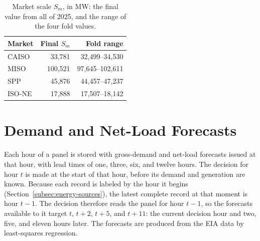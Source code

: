 \documentclass{UNCC-thesis}
\begin{document}
\begin{table}[htbp]
  \centering
  \footnotesize
  \caption{Market scale \(S_m\), in MW: the final value from
  all of 2025, and the range of the four fold values.}
  \label{tab:frozen-stats}
  \begin{tabular}{@{}lrr@{}}
    \toprule
    Market & Final \(S_m\) & Fold range \\
    \midrule
    CAISO          & 33,781  & 32,499--34,530 \\
    MISO           & 100,521 & 97,645--102,611 \\
    SPP            & 45,876  & 44,457--47,237 \\
    ISO-NE         & 17,888  & 17,507--18,142 \\
    \bottomrule
  \end{tabular}
\end{table}

\section{Demand and Net-Load Forecasts}
\label{subsec:energy-forecasts}

Each hour of a panel is stored with gross-demand and net-load forecasts
issued at that hour, with lead times of one, three, six, and twelve hours.
The decision for hour \(t\) is made at the start of that hour, before its
demand and generation are known. Because each record is labeled by the hour
it begins (Section~\ref{subsec:energy-sources}), the latest complete record
at that moment is hour \(t-1\). The decision therefore reads the panel for
hour \(t-1\), so the forecasts available to it target \(t\), \(t+2\),
\(t+5\), and \(t+11\): the current decision hour and two, five, and eleven
hours later. The forecasts are produced from the EIA data by least-squares
regression.
\end{document}
